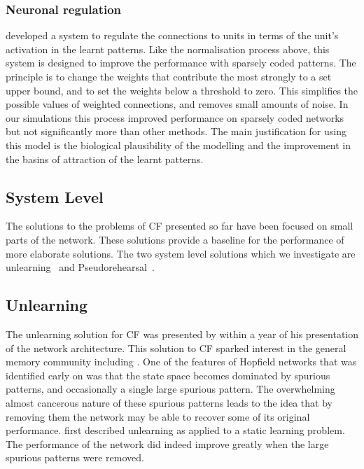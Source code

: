 \subsubsection{Neuronal regulation}

\citet{Horn1998a} developed a system to regulate the connections to units in terms of the unit's activation in the learnt patterns.  Like the normalisation process above, this system is designed to improve the performance with sparsely coded patterns.  The principle is to change the weights that contribute the most strongly to a set upper bound, and to set the weights below a threshold to zero.  This simplifies the possible values of weighted connections, and removes small amounts of noise.  In our simulations this process improved performance on sparsely coded networks but not significantly more than other methods.  The main justification for using this model is the biological plausibility of the modelling and the improvement in the basins of attraction of the learnt patterns. 

\subsection{System Level}

The solutions to the problems of CF presented so far have been focused on small parts of the network.  These solutions provide a baseline for the performance of more elaborate solutions.  The two system level solutions which we investigate are unlearning~\citep{Crick1983,Hopfield83,vanHemmen1997,Christos96} and Pseudorehearsal~\citep{Robins1998,Robins1999,French1999,Ans2004}.

\subsection{Unlearning}
\label{sec:simpleUnlearning}

The unlearning solution for CF was presented by \citet{Hopfield83} within a year of his presentation of the network architecture.  This solution to CF sparked interest in the general memory community including \citet{Crick1983}. One of the features of Hopfield networks that was identified early on was that the state space becomes dominated by spurious patterns, and occasionally a single large spurious pattern.  The overwhelming almost cancerous nature of these spurious patterns leads to the idea that by removing them the network may be able to recover some of its original performance. \citet{Hopfield83} first described unlearning as applied to a static learning problem.  The performance of the network did indeed improve greatly when the large spurious patterns were removed.  

